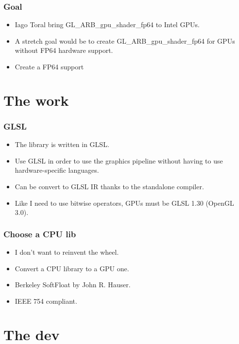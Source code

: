 \documentclass{beamer}
\begin{document}
\begin{frame}
\frametitle{Goal}
\begin{itemize}
\item Iago Toral bring GL\_ARB\_gpu\_shader\_fp64 to Intel GPUs.
\item A stretch goal would be to create GL\_ARB\_gpu\_shader\_fp64 for GPUs without FP64 hardware support.
\item Create a FP64 support
\end{itemize}
\end{frame}

\section{The work}

\begin{frame}
\frametitle{GLSL}
\begin{itemize}
\item The library is written in GLSL.
\item Use GLSL in order to use the graphics pipeline without having to use hardware-specific languages.
\item Can be convert to GLSL IR thanks to the standalone compiler.
\item Like I need to use bitwise operators, GPUs must be GLSL 1.30 (OpenGL 3.0).
\end{itemize}
\end{frame}


\begin{frame}
\frametitle{Choose a CPU lib}
\begin{itemize}
\item I don't want to reinvent the wheel.
\item Convert a CPU library to a GPU one.
\item Berkeley SoftFloat by John R. Hauser.
\item IEEE 754 compliant.
\end{itemize}
\end{frame}

\section{The dev}
\end{document}
